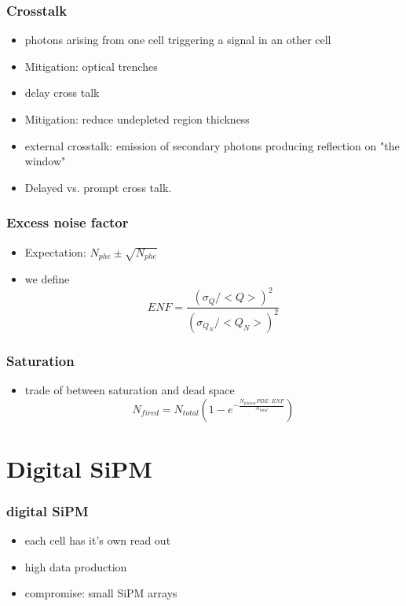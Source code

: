 \documentclass{beamer}
\begin{document}
\begin{frame}
  \frametitle{Crosstalk}
  \begin{itemize}
    \item photons arising from one cell triggering a signal in an other cell
    \item Mitigation: optical trenches
    \item delay cross talk
    \item Mitigation: reduce undepleted region thickness
    \item external crosstalk: emission of secondary photons producing reflection on "the window"
    \item Delayed vs. prompt cross talk.
  \end{itemize}
\end{frame}

\begin{frame}
  \frametitle{Excess noise factor}
  \begin{itemize}
    \item Expectation: $N_{phe}\pm\sqrt{N_{phe}}$
    \item we define
      \[ENF=\frac{(\sigma_Q/<Q>)^2}{(\sigma_{Q_N}/<Q_N>)^2}\]
  \end{itemize}
\end{frame}

\begin{frame}
  \frametitle{Saturation}
  \begin{itemize}
    \item trade of between saturation and dead space
      \[N_{fired}=N_{total}\left(1-e^{-\frac{N_{photon}PDE\cdot ENF}{N_{total}}}\right)\]
  \end{itemize}
\end{frame}

\section{Digital SiPM}

\begin{frame}
  \frametitle{digital SiPM}
  \begin{itemize}
    \item each cell has it's own read out
    \item high data production
    \item compromise: small SiPM arrays
  \end{itemize}
\end{frame}
\end{document}
